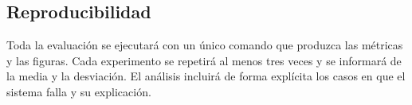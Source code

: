 \subsection{Reproducibilidad}

Toda la evaluación se ejecutará con un único comando que produzca las métricas y las figuras.
Cada experimento se repetirá al menos tres veces y se informará de la media y la desviación.
El análisis incluirá de forma explícita los casos en que el sistema falla y su explicación.

